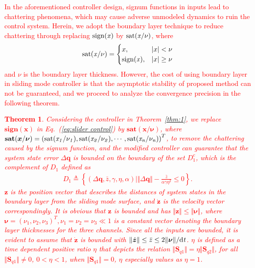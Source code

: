 \documentclass[3p]{elsarticle}
\theoremstyle{plain}
\newtheorem{mythm}{Theorem}
\theoremstyle{remark}
\begin{document}
\textcolor{red}{In the aforementioned controller design, signum functions in inputs lead to chattering phenomena, which may cause adverse unmodeled dynamics to ruin the control system. Herein, we adopt the boundary layer technique to reduce chattering through replacing $\rm{sign}\it{(x)}$ by $\rm{sat}\it{(x/\nu)}$, where
\begin{align}
\rm{sat}\it{(x/\nu)}=
\begin{cases}
x,&\vert x\vert <\nu\\
\rm{sign}\it{(x)},&\vert x\vert\ge\nu
\end{cases}
\end{align}
and $\nu$ is the boundary layer thickness. However, the cost of using boundary layer in sliding mode controller is that the asymptotic stability of proposed method can not be guaranteed, and we proceed to analyze the convergence precision in the following theorem.
\begin{mythm}\label{thm:boundary}
Considering the controller in Theorem~\ref{thm:1}, we replace $\mathbf{sign}{(\bm{x})}$ in Eq.~(\ref{eq:slider control}) by $\mathbf{sat}{(\boldsymbol {x/\nu})}$, where $\mathbf{sat}{(\boldsymbol{x}/\boldsymbol{\nu})}=\left(\rm{sat}\it{(x_1/\nu_1)},\rm{sat}\it{(x_2/\nu_2)},\cdots,\rm{sat}\it{(x_n/\nu_n)}\right)^T$, to remove the chattering caused by the signum function, and the modified controller can guarantee that the system state error $\Delta\bm q$ is bounded on the boundary of the set $D_1^c$, which is the complement of $D_1$ defined as
\begin{align}
  D_1\triangleq\left\{\left(\Delta\bm q,\bar z,\gamma,\eta,\alpha\right)\Big\vert\Vert\Delta\bm q\Vert-\frac{\bar z}{\alpha\gamma\eta^2}\le 0\right\}.
\end{align}
$\bm z$ is the position vector that describes the distances of system states in the boundary layer from the sliding mode surface, and $\dot{\bm z}$ is the velocity vector correspondingly. It is obvious that $\bm z$ is bounded and has $\Vert\bm z\Vert\le\Vert\bm\nu\Vert$, where $\bm\nu=(\nu_1,\nu_2,\nu_3)^T,\nu_1=\nu_2=\nu_3\ll 1$ is a constant vector denoting the boundary layer thicknesses for the three channels. Since all the inputs are bounded, it is evident to assume that $\dot{\bm z}$ is bounded with $\Vert\dot{\bm z}\Vert\le \bar z\le 2\Vert\bm\nu\Vert/\rm{d}\it{t}$. $\eta$ is defined as a time dependent positive ratio $\eta$ that depicts the relation $\Vert\bm S_{q1}\Vert=\eta\Vert\bm S_{q2}\Vert$, for all $\Vert\bm S_{q1}\Vert\neq 0$, $0<\eta<1$, when $\Vert\bm S_{q1}\Vert= 0$, $\eta$ especially values as $\eta = 1$.

\end{mythm}}
\end{document}
